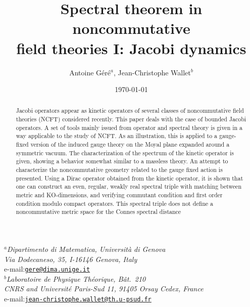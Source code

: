 \documentclass[a4paper,11pt,twoside]{article}
\makeatletter
\numberwithin{equation}{section}
\theoremstyle{nonumberplain}
\newcounter{and}
\newcommand{\institute}[1]{\newcommand{\@institute}{#1}}
\renewcommand{\maketitle}{
%
\vspace*{0.5\baselineskip}
%
{%
\center\LARGE\noindent\@title\par
}%
%
\vspace{1.5\baselineskip}
%
{%
\center\normalsize\noindent\ignorespaces\@author\par
}%
%
\vspace{0.5\baselineskip}
%
{%
\center\normalsize\ignorespaces\@institute\par
}%
%
\vspace{2\baselineskip}
%
}%
\makeatother
\begin{document}

\title{Spectral theorem in noncommutative\\field theories I: Jacobi dynamics}

\author{Antoine G\'er\'e$^a$, Jean-Christophe Wallet$^b$}

\institute{%
%
\textit{$^a$Dipartimento di Matematica, Universit\`a di Genova\\
Via Dodecaneso, 35, I-16146 Genova, Italy}\\
e-mail:\href{mailto:gere@dima.unige.it}{\texttt{gere@dima.unige.it}}\\[1ex]%
%
\textit{$^b$Laboratoire de Physique Th\'eorique, B\^at.\ 210\\
CNRS and Universit\'e Paris-Sud 11,  91405 Orsay Cedex, France}\\
e-mail:\href{mailto:jean-christophe.wallet@th.u-psud.fr}{\texttt{jean-christophe.wallet@th.u-psud.fr}}\\[1ex]%
%
}%

\date{\today}

\maketitle


\begin{abstract}
Jacobi operators appear as kinetic operators of several classes of noncommutative field theories (NCFT) considered recently. This paper deals with the case of bounded Jacobi operators. A set of tools mainly issued from operator and spectral theory is given in a way applicable to the study of NCFT. As an illustration, this is applied to a gauge-fixed version of the induced gauge theory on the Moyal plane expanded around a symmetric vacuum. The characterization of the spectrum of the kinetic operator is given, showing a behavior somewhat similar to a massless theory. An attempt to characterize the noncommutative geometry related to the gauge fixed action is presented. Using a Dirac operator obtained from the kinetic operator, it is shown that one can construct an even, regular, weakly real spectral triple with matching between metric and KO-dimensions, and verifying commutant condition and first order condition modulo compact operators. This spectral triple does not define a noncommutative metric space for the 
Connes spectral distance
\end{abstract}
\end{document}
